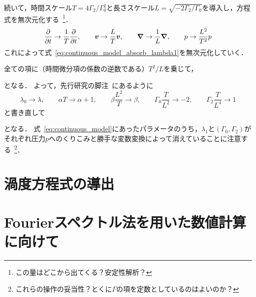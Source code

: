 \documentclass[12pt,dvipdfmx,svgnames,a4paper,uplatex]{ujarticle}
\theoremstyle{plain}
\begin{document}
続いて，時間スケール\(T = 4\Gamma_2/\Gamma_0^2\)と長さスケール\(L = \sqrt{-2\Gamma_2/\Gamma_0}\)を導入し，方程式を無次元化する~\footnote{この量はどこから出てくる？安定性解析？}．
\begin{equation}
  \pdv{t} \to \frac{1}{T} \pdv{t}, \qquad \vb*{v} \to \frac{L}{T} \vb*{v}, \qquad \grad \to \frac{1}{L} \grad, \qquad p \to \frac{L^2}{T^2} p
  \label{eq:nondimensionalization_list}
\end{equation}
これによって式~\ref{eq:continuous_model_absorb_lambda1}を無次元化していく．
全ての項に（時間微分項の係数の逆数である）\(T^2/L\)を乗じて，
となる．
よって，先行研究の脚注~\cite[脚注28]{James2017}にあるように
\begin{equation}
  \lambda_0 \to \lambda, \qquad \alpha T \to \alpha + 1, \qquad \beta \frac{L^2}{T} \to \beta, \qquad \Gamma_0 \frac{T}{L^2} \to -2, \qquad \Gamma_2 \frac{T}{L^4} \to 1
  \label{eq:redefine_parameters}
\end{equation}
と書き直して
となる．
式~\ref{eq:continuous_model}にあったパラメータのうち，\(\lambda_1\)と\((\Gamma_0, \Gamma_2)\)がそれぞれ圧力\(p\)へのくりこみと勝手な変数変換によって消えていることに注意する~\footnote{これらの操作の妥当性？とくに\(\Gamma\)の項を定数としているのはよいのか？}．


\section{渦度方程式の導出}


\section{Fourierスペクトル法を用いた数値計算に向けて}


\printbibliography[title=参考文献]
\end{document}
